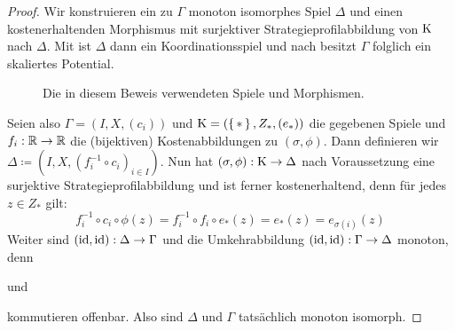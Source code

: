 \begin{proof}
	Wir konstruieren ein zu $\Gamma$ monoton isomorphes Spiel $\Delta$ und einen kostenerhaltenden Morphismus mit surjektiver Strategieprofilabbildung von $\mathrm{K}$ nach $\Delta$. Mit  ist $\Delta$ dann ein Koordinationsspiel und nach  besitzt $\Gamma$ folglich ein skaliertes Potential.
	\begin{figure}[h]\centering
		\caption{Die in diesem Beweis verwendeten Spiele und Morphismen.}
	\end{figure}		
	Seien also $\Gamma = (I, X, (c_i))$  und $\mathrm{K} = (\set{\ast}, Z_\ast, (e_\ast))$ die gegebenen Spiele und $f_i: \mathbb{R} \to \mathbb{R}$ die (bijektiven) Kostenabbildungen zu $(\sigma, \phi)$. Dann definieren wir $\Delta \coloneqq (I, X, (f_i^{-1}\circ c_i)_{i \in I})$. Nun hat $(\sigma, \phi): \mathrm{K} \to \Delta$ nach Voraussetzung eine surjektive Strategieprofilabbildung und ist ferner kostenerhaltend, denn für jedes $z \in Z_\ast$ gilt:
		\[f_i^{-1}\circ c_i \circ \phi(z) = f_i^{-1} \circ f_i \circ e_\ast(z) = e_\ast(z) = e_{\sigma(i)}(z) \]
	Weiter sind $(\mathrm{id}, \mathrm{id}): \Delta \to \Gamma$ und die Umkehrabbildung $(\mathrm{id}, \mathrm{id}): \Gamma \to \Delta$ monoton, denn
	\begin{center}
			und
	\end{center}		
	kommutieren offenbar. Also sind $\Delta$ und $\Gamma$ tatsächlich monoton isomorph.
\end{proof}

